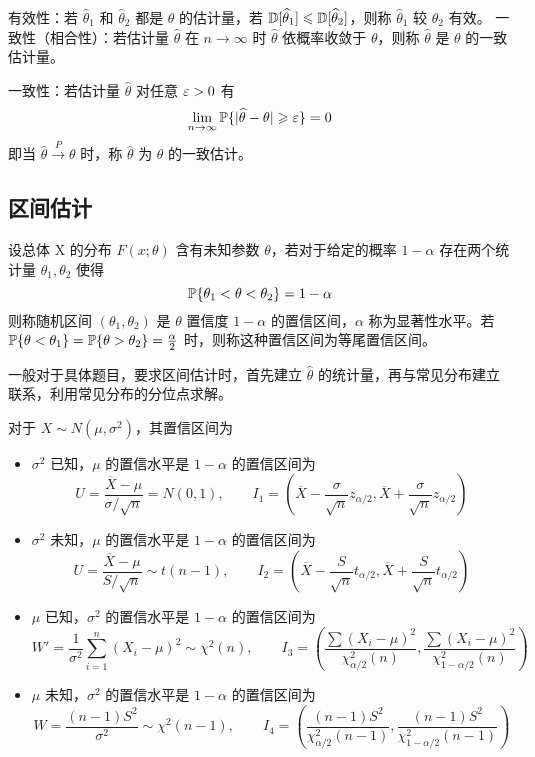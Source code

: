有效性：若 $\widehat{\theta}_1$ 和 $\widehat{\theta}_2$ 都是 $\theta$ 的估计量，若 $\mathbb{D}[\widehat{\theta}_1] \leqslant \mathbb{D}[\widehat{\theta}_2]$，则称 $\widehat{\theta}_1$ 较 $\widehat{\theta}_2$ 有效。
一致性（相合性）：若估计量 $\widehat{\theta}$ 在 $n \to \infty$ 时 $\widehat{\theta}$ 依概率收敛于 $\theta$，则称 $\widehat{\theta}$ 是 $\theta$ 的一致估计量。

一致性：若估计量 $\widehat{\theta}$ 对任意 $\varepsilon > 0$ 有
\[ \lim_{n \to \infty} \mathbb{P}\{|\widehat{\theta}-\theta| \geqslant \varepsilon\} = 0 \]
即当 $\widehat{\theta} \stackrel{P}{\longrightarrow} \theta$ 时，称 $\widehat{\theta}$ 为 $\theta$ 的一致估计。

\subsection{区间估计}

设总体 X 的分布 $F(x;\theta)$ 含有未知参数 $\theta$，若对于给定的概率 $1 - \alpha$ 存在两个统计量 $\theta_1, \theta_2$ 使得
\[ \mathbb{P}\{\theta_1 < \theta < \theta_2\} = 1-\alpha \]
则称随机区间 $(\theta_1, \theta_2)$ 是 $\theta$ 置信度 $1-\alpha$ 的置信区间，$\alpha$ 称为显著性水平。若 $\mathbb{P}\{\theta < \theta_1\} = \mathbb{P}\{\theta > \theta_2\} = \frac{\alpha}{2}$ 时，则称这种置信区间为等尾置信区间。

一般对于具体题目，要求区间估计时，首先建立 $\widehat{\theta}$ 的统计量，再与常见分布建立联系，利用常见分布的分位点求解。

对于 $X \sim N(\mu,\sigma^2)$，其置信区间为
\begin{itemize}
	\item $\sigma^2$ 已知，$\mu$ 的置信水平是 $1-\alpha$ 的置信区间为
	      \[ U = \frac{\overline{X} - \mu}{\sigma/\sqrt{n}} = N(0, 1), \qquad
		      I_1 = \left(\overline{X} - \frac{\sigma}{\sqrt{n}} z_{\alpha/2},\overline{X} + \frac{\sigma}{\sqrt{n}} z_{\alpha/2} \right) \]
	\item $\sigma^2$ 未知，$\mu$ 的置信水平是 $1-\alpha$ 的置信区间为
	      \[ U = \frac{\overline{X} - \mu}{S/\sqrt{n}} \sim t(n-1), \qquad
		      I_2 = \left(\overline{X} - \frac{S}{\sqrt{n}} t_{\alpha/2},\overline{X} + \frac{S}{\sqrt{n}} t_{\alpha/2} \right) \]
	\item $\mu$ 已知，$\sigma^2$ 的置信水平是 $1-\alpha$ 的置信区间为
	      \[ W' = \frac{1}{\sigma^2}\sum_{i=1}^n (X_i - \mu)^2\sim \chi^2(n), \qquad
		      I_3 = \left(\frac{\sum (X_i - \mu)^2}{\chi^2_{\alpha/2}(n)} , \frac{\sum (X_i - \mu)^2}{\chi^2_{1-\alpha/2}(n)} \right) \]
	\item $\mu$ 未知，$\sigma^2$ 的置信水平是 $1-\alpha$ 的置信区间为
	      \[ W = \frac{(n-1)S^2}{\sigma^2} \sim \chi^2(n-1), \qquad
		      I_4 = \left(\frac{(n-1)S^2}{\chi^2_{\alpha/2}(n-1)} , \frac{(n-1)S^2}{\chi^2_{1-\alpha/2}(n-1)} \right) \]
\end{itemize}

